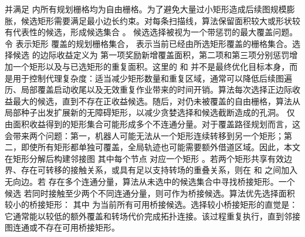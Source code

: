 {}并满足  内所有规划栅格均为自由栅格。为了避免大量过小矩形造成后续图规模膨胀，候选矩形需要满足最小边长约束。对每条扫描线，算法保留面积较大或形状较有代表性的候选，形成候选集合 。\markdownRendererParagraphSeparator
{}候选选择被视为一个带惩罚的最大覆盖问题。令  表示矩形  覆盖的规划栅格集合， 表示当前已经由所选矩形覆盖的栅格集合。选择候选  的边际收益定义为\markdownRendererParagraphSeparator
{}\markdownRendererParagraphSeparator
{}第一项奖励新增覆盖面积，第二项和第三项分别惩罚增加一个矩形以及与已选矩形的重复面积。这里的 \markdownRendererInlineMath{\alpha} 和 \markdownRendererInlineMath{\beta} 并不是最终优化目标本身，而是用于控制代理复杂度：适当减少矩形数量和重复区域，通常可以降低后续图遍历、局部覆盖启动收尾以及无效重复作业带来的时间开销。算法每次选择正边际收益最大的候选，直到不存在正收益候选。随后，对仍未被覆盖的自由栅格，算法从局部种子出发扩展新的无障碍矩形，以减少贪婪选择和候选截断造成的孔洞。\markdownRendererParagraphSeparator
{}
\markdownRendererSectionEnd \markdownRendererSectionBegin
{}\markdownRendererParagraphSeparator
{}仅由面积收益得到的矩形集合可能形成多个不连通分量。对于覆盖路径规划而言，这会带来两个问题：第一，机器人可能无法从一个矩形连续转移到另一个矩形；第二，即使所有矩形都单独可覆盖，全局轨迹也可能需要额外借道区域。因此，本文在矩形分解后构建邻接图\markdownRendererParagraphSeparator
{}\markdownRendererParagraphSeparator
{}其中每个节点  对应一个矩形 。若两个矩形共享有效边界、存在可转移的接触关系，或具有足以支持转场的重叠关系，则在  和  之间加入无向边。若  存在多个连通分量，算法从未选中的候选集合中寻找桥接矩形。一个候选  若同时接触至少两个不同连通分量，则可作为桥接候选。算法优先选择面积较小的桥接矩形：\markdownRendererParagraphSeparator
{}\markdownRendererParagraphSeparator
{}其中  为当前所有可用桥接候选。选择较小桥接矩形的直觉是：它通常能以较低的额外覆盖和转场代价完成拓扑连接。该过程重复执行，直到邻接图连通或不存在可用桥接矩形。\markdownRendererParagraphSeparator

